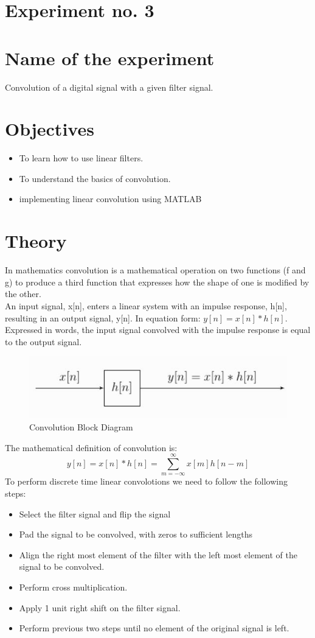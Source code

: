 \documentclass[a4paper,11pt]{article}
\begin{document}
	\section*{Experiment no. 3}
	\section*{Name of the experiment}
	Convolution of a digital signal with a given filter signal.
	\section*{Objectives}
	\begin{itemize}
		\item To learn how to use linear filters. 
		\item To understand the basics of convolution.
		\item implementing linear convolution using MATLAB
		
	\end{itemize}
	\section*{Theory}
	In mathematics convolution is a mathematical operation on two functions (f and g) to produce a third function that expresses how the shape of one is modified by the other.\\
	
	An input signal, x[n], enters a linear system with an impulse response, h[n], resulting in an output signal, y[n]. In equation form: $y[n] = x[n] * h[n].$ Expressed in words, the input signal convolved with the impulse response is equal to the output signal.
	
	\begin{figure}[h]
		\centering
		\includegraphics{Capture.jpg}
		\caption{Convolution Block Diagram}
		\label{convlution}
	\end{figure}
	The mathematical definition of convolution is:
	$$ y[n] = x[n] * h[n] = \sum_{m=-\infty}^{\infty}x[m]h[n-m] $$
	To perform discrete time linear convolotions we need to follow the following steps:
	\begin{itemize}
		\item Select the filter signal and flip the signal
		\item Pad the signal to be convolved, with zeros to sufficient lengths
		\item Align the right most element of the filter with the left most element of the signal to be convolved.
		\item Perform cross multiplication.
		\item Apply 1 unit right shift on the filter signal.
		\item Perform previous two steps until no element of the original signal is left.
	\end{itemize}
	 
\end{document}
